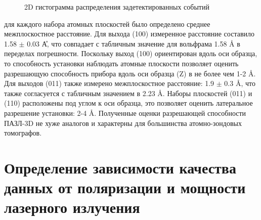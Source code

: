 \begin{figure}[htb]
	\centerfloat{
		\texttt{[image: W\_3D]}
	}
	\caption{2D гистограмма распределения задетектированных событий}
	\label{fig:W_3D}
\end{figure}

для каждого набора атомных плоскостей было определено среднее межплоскостное расстояние. Для выхода (100) измеренное расстояние составило 1.58 $\pm$ 0.03 \r{А}, что совпадает с табличным значение для вольфрама 1.58 \r{A} в переделах погрешности. Поскольку выход (100) ориентирован вдоль оси образца, то способность установки наблюдать атомные плоскости позволяет оценить разрешающую способность прибора вдоль оси образца (Z) в не более чем 1-2 \r{A}. Для выходов (011) также измерено межплоскостное расстояние: 1.9 $\pm$ 0.3 \r{A}, что также согласуется с табличным значением в 2.23 \r{A}. Наборы плоскостей (011) и (110) расположены под углом к оси образца, это позволяет оценить латеральное разрешение установки: 2-4 \r{A}. Полученные оценки разрешающей способности ПАЗЛ-3D не хуже аналогов и характерны для большинства атомно-зондовых томографов. 

\FloatBarrier

\section{Определение зависимости качества данных от поляризации и мощности лазерного излучения}\label{sec:ch3/sect2}

